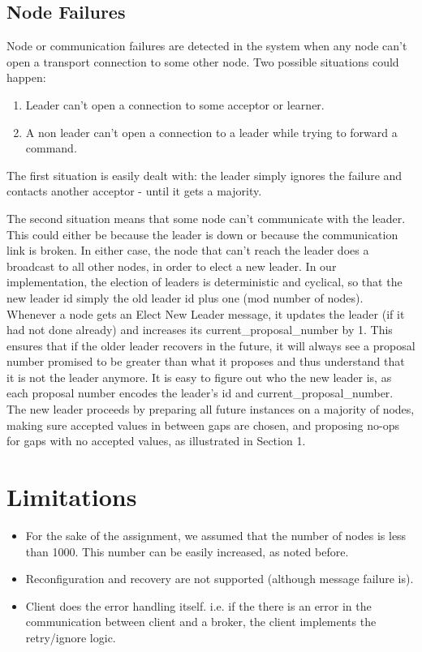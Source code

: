 \documentclass[letterpaper]{article}
\begin{document}
\subsection{Node Failures}
Node or communication failures are detected in the system when any node can't
open a transport connection to some other node. Two possible situations could happen:

\begin{enumerate}
\item Leader can't open a connection to some acceptor or learner. 
\item A non leader can't open a connection to a leader while trying to forward a command.
\end{enumerate}

The first situation is easily dealt with: the leader simply ignores the failure
and contacts another acceptor - until it gets a
majority.

The second situation means that some node can't communicate with the
leader. This could either be because the leader is down or because the
communication link is broken. In either case, the node that can't reach the
leader does a broadcast to all other nodes, in order to elect a new leader. In
our implementation, the election of leaders is deterministic and cyclical, so
that the new leader id simply the old leader id plus one (mod number of nodes).
Whenever a node gets an Elect New Leader message, it updates the leader (if it
had not done already) and increases its current\_proposal\_number by 1. This
ensures that if the older leader recovers in the future, it will always see a
proposal number promised to be greater than what it proposes and thus understand
that it is not the leader anymore. It is easy to figure out who the new leader
is, as each proposal number encodes the leader's id and current\_proposal\_number.
The new leader proceeds by preparing all future instances on a majority of
nodes, making sure accepted values in between
gaps are chosen, and proposing no-ops for gaps with no accepted values, as
illustrated in Section 1. 

\section{Limitations}
\begin{itemize}
\item For the sake of the assignment, we assumed that the number of nodes is
less than 1000. This number can be easily increased, as noted before.
\item Reconfiguration and recovery are not supported (although message failure
is).
\item Client does the error handling itself. i.e. if the there is an error in
the communication between client and a broker, the client implements the
retry/ignore logic.
\end{itemize}
\end{document}
